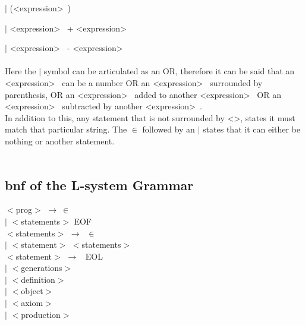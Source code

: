 \hspace{2cm} $|$ (\textless expression\textgreater~) 

\hspace{2cm} $|$ \textless expression\textgreater~ + \textless expression\textgreater~ 

\hspace{2cm} $|$ \textless expression\textgreater~ - \textless expression\textgreater~ \\
\\
Here the $|$ symbol can be articulated as an OR, therefore it can be said that an \textless expression\textgreater~ can be a number OR an \textless expression\textgreater~ surrounded by parenthesis, OR an \textless expression\textgreater~ added to another \textless expression\textgreater~ OR an \textless expression\textgreater~ subtracted by another \textless expression\textgreater~. 
\\
In addition to this, any statement that is not surrounded by \textless \textgreater, states it must match that particular string. The $\in$ followed by an $|$ states that it can either be nothing or another statement. \\
\\

\subsection{\acrlong{bnf} of the L-system Grammar} \label{L-system Grammar}

	$<$prog$>$ $\rightarrow~ \in$ \\
	\hspace{2cm} $|$ $<$statements$>$ EOF \\
	
	\noindent
	$<$statements$>$ $\rightarrow~$ $\in$ \\
	\hspace{2cm} $|$ $<$statement$>$ $<$statements$>$ \\ 
	
	\noindent
	$<$statement$>$ $\rightarrow$~ EOL \\
	\hspace{2cm} $|$ $<$generations$>$ \\ 
	\hspace{2cm} $|$ $<$definition$>$ \\ 
	\hspace{2cm} $|$ $<$object$>$ \\ 
	\hspace{2cm} $|$ $<$axiom$>$ \\ 
	\hspace{2cm} $|$ $<$production$>$ \\ 
	

